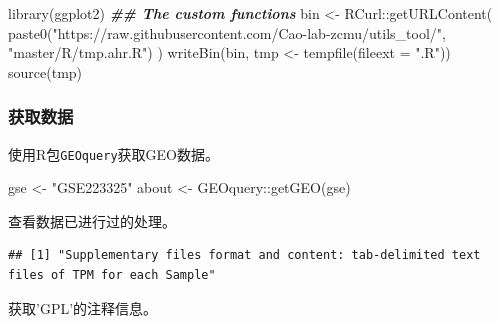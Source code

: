 \documentclass[
]{article}
\newenvironment{Shaded}{\begin{snugshade}}{\end{snugshade}}
\newcommand{\AttributeTok}[1]{\textcolor[rgb]{0.77,0.63,0.00}{#1}}
\newcommand{\DecValTok}[1]{\textcolor[rgb]{0.00,0.00,0.81}{#1}}
\newcommand{\DocumentationTok}[1]{\textcolor[rgb]{0.56,0.35,0.01}{\textbf{\textit{#1}}}}
\newcommand{\FloatTok}[1]{\textcolor[rgb]{0.00,0.00,0.81}{#1}}
\newcommand{\FunctionTok}[1]{\textcolor[rgb]{0.00,0.00,0.00}{#1}}
\newcommand{\NormalTok}[1]{#1}
\newcommand{\OtherTok}[1]{\textcolor[rgb]{0.56,0.35,0.01}{#1}}
\newcommand{\SpecialCharTok}[1]{\textcolor[rgb]{0.00,0.00,0.00}{#1}}
\newcommand{\StringTok}[1]{\textcolor[rgb]{0.31,0.60,0.02}{#1}}
\begin{document}
\begin{Shaded}
\begin{Highlighting}[]
\FunctionTok{library}\NormalTok{(ggplot2)}
\DocumentationTok{\#\# The custom functions}
\NormalTok{bin }\OtherTok{\textless{}{-}}\NormalTok{ RCurl}\SpecialCharTok{::}\FunctionTok{getURLContent}\NormalTok{(}
  \FunctionTok{paste0}\NormalTok{(}\StringTok{"https://raw.githubusercontent.com/Cao{-}lab{-}zcmu/utils\_tool/"}\NormalTok{,}
    \StringTok{"master/R/tmp.ahr.R"}\NormalTok{)}
\NormalTok{)}
\FunctionTok{writeBin}\NormalTok{(bin, tmp }\OtherTok{\textless{}{-}} \FunctionTok{tempfile}\NormalTok{(}\AttributeTok{fileext =} \StringTok{".R"}\NormalTok{))}
\FunctionTok{source}\NormalTok{(tmp)}
\end{Highlighting}
\end{Shaded}

\hypertarget{ux83b7ux53d6ux6570ux636e}{%
\subsubsection{获取数据}\label{ux83b7ux53d6ux6570ux636e}}

使用R包\texttt{GEOquery}获取GEO数据。

\begin{Shaded}
\begin{Highlighting}[]
\NormalTok{gse }\OtherTok{\textless{}{-}} \StringTok{"GSE223325"}
\NormalTok{about }\OtherTok{\textless{}{-}}\NormalTok{ GEOquery}\SpecialCharTok{::}\FunctionTok{getGEO}\NormalTok{(gse)}
\end{Highlighting}
\end{Shaded}

查看数据已进行过的处理。

\begin{Shaded}
\end{Shaded}

\begin{verbatim}
## [1] "Supplementary files format and content: tab-delimited text files of TPM for each Sample"
\end{verbatim}

获取'GPL'的注释信息。

\begin{Shaded}
\end{Shaded}
\end{document}

